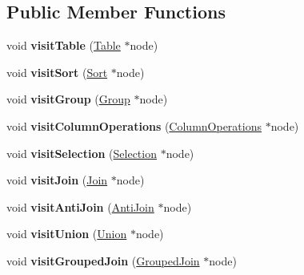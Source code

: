 \subsection*{Public Member Functions}
\begin{DoxyCompactItemize}
\item 
\hypertarget{class_push_selection_up_visitor_a49d89f3e9903973eb8f5f2def10b610a}{void {\bfseries visit\+Table} (\hyperlink{class_table}{Table} $\ast$node)}\label{class_push_selection_up_visitor_a49d89f3e9903973eb8f5f2def10b610a}

\item 
\hypertarget{class_push_selection_up_visitor_aebf9cd9ee7fac772858d38032fb9f9c6}{void {\bfseries visit\+Sort} (\hyperlink{class_sort}{Sort} $\ast$node)}\label{class_push_selection_up_visitor_aebf9cd9ee7fac772858d38032fb9f9c6}

\item 
\hypertarget{class_push_selection_up_visitor_a51fedeb8865cec0532a4e782f1509e40}{void {\bfseries visit\+Group} (\hyperlink{class_group}{Group} $\ast$node)}\label{class_push_selection_up_visitor_a51fedeb8865cec0532a4e782f1509e40}

\item 
\hypertarget{class_push_selection_up_visitor_a809307b64dbe99c9506c1fdcf0792ded}{void {\bfseries visit\+Column\+Operations} (\hyperlink{class_column_operations}{Column\+Operations} $\ast$node)}\label{class_push_selection_up_visitor_a809307b64dbe99c9506c1fdcf0792ded}

\item 
\hypertarget{class_push_selection_up_visitor_a599ad51a56f02157281633856dbcd733}{void {\bfseries visit\+Selection} (\hyperlink{class_selection}{Selection} $\ast$node)}\label{class_push_selection_up_visitor_a599ad51a56f02157281633856dbcd733}

\item 
\hypertarget{class_push_selection_up_visitor_afd03d5acd48024c97c27d6859f077634}{void {\bfseries visit\+Join} (\hyperlink{class_join}{Join} $\ast$node)}\label{class_push_selection_up_visitor_afd03d5acd48024c97c27d6859f077634}

\item 
\hypertarget{class_push_selection_up_visitor_a0267c656408d5dc7c540accc7724d2ca}{void {\bfseries visit\+Anti\+Join} (\hyperlink{class_anti_join}{Anti\+Join} $\ast$node)}\label{class_push_selection_up_visitor_a0267c656408d5dc7c540accc7724d2ca}

\item 
\hypertarget{class_push_selection_up_visitor_a7d838443bb3c8412fcc495903ecef554}{void {\bfseries visit\+Union} (\hyperlink{class_union}{Union} $\ast$node)}\label{class_push_selection_up_visitor_a7d838443bb3c8412fcc495903ecef554}

\item 
\hypertarget{class_push_selection_up_visitor_a3602decc9634a34efd1f2fe2c3ce99f4}{void {\bfseries visit\+Grouped\+Join} (\hyperlink{class_grouped_join}{Grouped\+Join} $\ast$node)}\label{class_push_selection_up_visitor_a3602decc9634a34efd1f2fe2c3ce99f4}

\end{DoxyCompactItemize}

